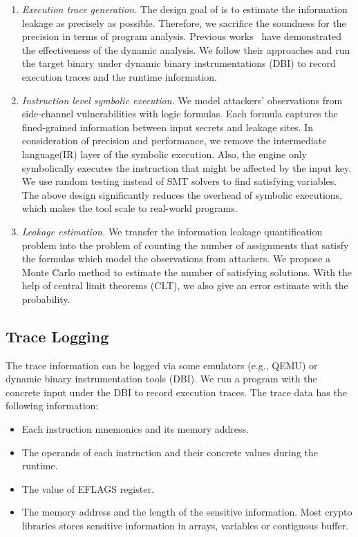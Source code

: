 \begin{enumerate}
    \item \emph{Execution trace generation.} The design goal of \tool{} is to
    estimate the information leakage as precisely as possible. Therefore,
    we sacrifice the soundness for the precision in terms of program analysis.
    Previous works~\cite{203878,217537} have demonstrated the effectiveness of the
    dynamic analysis. We follow their approaches and run the target binary under
    dynamic binary instrumentations (DBI) to record execution traces and 
    the runtime information.
    \item \emph{Instruction level symbolic execution.} We model attackers' observations 
    from side-channel vulnerabilities with logic formulas. Each formula captures the 
    fined-grained information between input secrets and leakage sites. In consideration 
    of precision and performance, we remove the intermediate language(IR) layer of 
    the symbolic execution. 
    Also, the engine only symbolically executes the instruction that might be 
    affected by the input key. We use random testing instead of SMT solvers to find 
    satisfying variables.
    The above design significantly reduces the overhead of symbolic executions, which 
    makes the tool scale to real-world programs.
    \item \emph{Leakage estimation.} We transfer the information leakage quantification 
    problem into the problem of counting the number of assignments that satisfy the 
    formulas which model the observations from attackers. We propose a Monte Carlo 
    method to estimate the number of satisfying solutions. With the help of central 
    limit theorems (CLT), we also give an error estimate with the probability.

\end{enumerate}


\subsection{Trace Logging}
The trace information can be logged via some emulators (e.g., QEMU) or 
dynamic binary instrumentation tools (DBI). 
We run a program with the concrete input under the DBI to record
execution traces.
The trace data has the following information:
\begin{itemize}
    \item Each instruction mnemonics and its memory address.
    \item The operands of each instruction and their concrete values during the 
          runtime.
    \item The value of EFLAGS register. 
    \item The memory address and the length of the sensitive information.
     Most crypto libraries stores sensitive information in arrays,
     variables or contiguous buffer.
\end{itemize}

